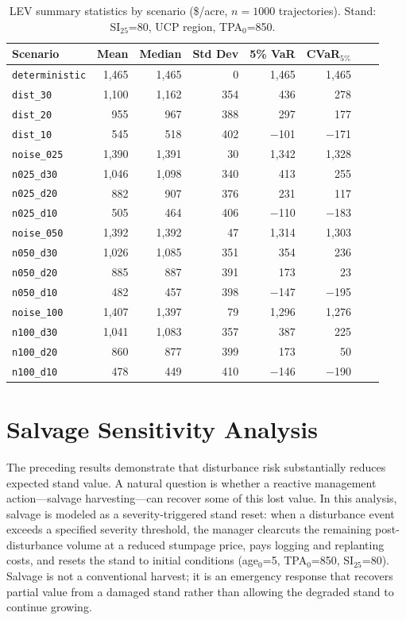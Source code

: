 \documentclass[12pt]{report}
\begin{document}
\begin{table}[htbp]
  \centering
  \caption{LEV summary statistics by scenario (\$/acre, $n=1000$ trajectories). Stand: SI$_{25}$=80, UCP region, TPA$_0$=850.}
  \label{tab:lev_summary}
  \small
  \begin{tabular}{lrrrrrrr}
  \toprule
  Scenario & Mean & Median & Std Dev & 5\% VaR & CVaR$_{5\%}$ \\
  \midrule
  \texttt{deterministic} & 1{,}465 & 1{,}465 & 0 & 1{,}465 & 1{,}465 \\
  \texttt{dist\_30}      & 1{,}100 & 1{,}162 & 354 & 436  & 278 \\
  \texttt{dist\_20}      & 955  & 967  & 388 & 297  & 177 \\
  \texttt{dist\_10}      & 545  & 518  & 402 & $-$101 & $-$171 \\
  \texttt{noise\_025}    & 1{,}390 & 1{,}391 & 30  & 1{,}342 & 1{,}328 \\
  \texttt{n025\_d30}     & 1{,}046 & 1{,}098 & 340 & 413  & 255 \\
  \texttt{n025\_d20}     & 882  & 907  & 376 & 231  & 117 \\
  \texttt{n025\_d10}     & 505  & 464  & 406 & $-$110 & $-$183 \\
  \texttt{noise\_050}    & 1{,}392 & 1{,}392 & 47  & 1{,}314 & 1{,}303 \\
  \texttt{n050\_d30}     & 1{,}026 & 1{,}085 & 351 & 354  & 236  \\
  \texttt{n050\_d20}     & 885  & 887  & 391 & 173  & 23  \\
  \texttt{n050\_d10}     & 482  & 457  & 398 & $-$147 & $-$195 \\
  \texttt{noise\_100}    & 1{,}407 & 1{,}397 & 79  & 1{,}296 & 1{,}276 \\
  \texttt{n100\_d30}     & 1{,}041 & 1{,}083 & 357 & 387  & 225  \\
  \texttt{n100\_d20}     & 860  & 877  & 399 & 173  & 50 \\
  \texttt{n100\_d10}     & 478  & 449  & 410 & $-$146 & $-$190 \\
  \bottomrule
  \end{tabular}
\end{table}

\section{Salvage Sensitivity Analysis}

The preceding results demonstrate that disturbance risk substantially reduces expected stand value. A natural question is whether a reactive management action---salvage harvesting---can recover some of this lost value. In this analysis, salvage is modeled as a severity-triggered stand reset: when a disturbance event exceeds a specified severity threshold, the manager clearcuts the remaining post-disturbance volume at a reduced stumpage price, pays logging and replanting costs, and resets the stand to initial conditions (age$_0$=5, TPA$_0$=850, SI$_{25}$=80). Salvage is not a conventional harvest; it is an emergency response that recovers partial value from a damaged stand rather than allowing the degraded stand to continue growing.
\end{document}
